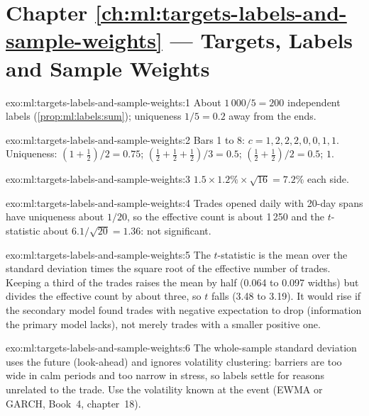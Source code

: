 \section*{Chapter \ref{ch:ml:targets-labels-and-sample-weights} --- Targets, Labels and Sample Weights}

\begin{solution}{exo:ml:targets-labels-and-sample-weights:1}
About $1\,000/5 = 200$ independent labels (\cref{prop:ml:labels:sum}); uniqueness $1/5 = 0.2$ away from the ends.
\end{solution}

\begin{solution}{exo:ml:targets-labels-and-sample-weights:2}
Bars 1 to 8: $c = 1, 2, 2, 2, 0, 0, 1, 1$. Uniqueness: $(1 + \tfrac12)/2 = 0.75$; $(\tfrac12 + \tfrac12 + \tfrac12)/3 =
0.5$; $(\tfrac12 + \tfrac12)/2 = 0.5$; $1$.
\end{solution}

\begin{solution}{exo:ml:targets-labels-and-sample-weights:3}
$1.5\times1.2\%\times\sqrt{16} = 7.2\%$ each side.
\end{solution}

\begin{solution}{exo:ml:targets-labels-and-sample-weights:4}
Trades opened daily with 20-day spans have uniqueness about $1/20$, so the effective count is about 1\,250 and the
$t$-statistic about $6.1/\sqrt{20} = 1.36$: not significant.
\end{solution}

\begin{solution}{exo:ml:targets-labels-and-sample-weights:5}
The $t$-statistic is the mean over the standard deviation times the square root of the effective number of trades.
Keeping a third of the trades raises the mean by half (0.064 to 0.097 widths) but divides the effective count by about
three, so $t$ falls (3.48 to 3.19). It would rise if the secondary model found trades with negative expectation to drop
(information the primary model lacks), not merely trades with a smaller positive one.
\end{solution}

\begin{solution}{exo:ml:targets-labels-and-sample-weights:6}
The whole-sample standard deviation uses the future (look-ahead) and ignores volatility clustering: barriers are too
wide in calm periods and too narrow in stress, so labels settle for reasons unrelated to the trade. Use the volatility
known at the event (EWMA or GARCH, Book~4, chapter~18).
\end{solution}

